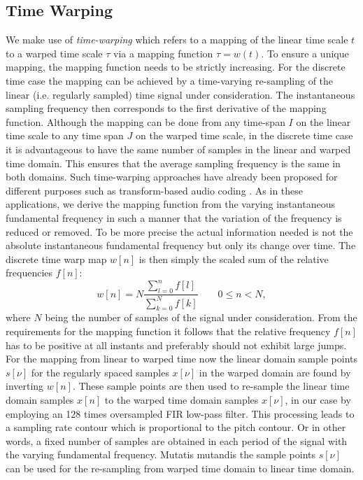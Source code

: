 \subsection{Time Warping}
We make use of \emph{time-warping} which refers to a mapping of the linear time scale $t$ to a warped time scale $\tau$ via a mapping function $\tau=w(t)$.
To ensure a unique mapping, the mapping function needs to be strictly increasing.
For the discrete time case the mapping can be achieved by a time-varying re-sampling of the linear (i.e. regularly sampled) time signal under consideration.
The instantaneous sampling frequency then corresponds to the first derivative of
the mapping function. Although the mapping can be done from any time-span
$I$ on the linear time scale to any time span $J$ on the warped time scale, in
the discrete time case it is advantageous to have the same number of samples
in the linear and warped time domain. This ensures that the average sampling
frequency is the same in both domains. Such time-warping approaches have already
been proposed for different purposes such as transform-based audio coding
\cite{edler09}. As in these applications, we derive the mapping function from
the varying instantaneous fundamental frequency in such a manner that the variation of the frequency is
reduced or removed. To be more precise the actual information needed is not
the absolute instantaneous fundamental frequency but only its change over time.
The discrete time warp map $w[n]$ is then simply the scaled sum of the relative
frequencies $f[n]$:
\begin{equation}
w[n]=N \frac{\sum^n_{l=0}{f[l]}}{\sum^N_{k=0}{f[k]}}  \qquad 0\leq n<N,
\end{equation}
where $N$ being the number of samples of the signal under consideration.
From the requirements for the mapping function it follows that the relative
frequency $f[n]$ has to be positive at all instants and preferably should not
exhibit large jumps.
For the mapping from linear to warped time now the linear domain sample points
$s[\nu]$ for the regularly spaced samples $x[\nu]$ in the warped domain are
found by inverting $w[n]$. These sample points are then used to re-sample the linear time
domain samples $x[n]$ to the warped time domain samples $x[\nu]$, in our case
by employing an 128 times oversampled FIR low-pass filter. This processing leads to a sampling rate contour which is proportional to the pitch contour. Or in other words, a fixed number of samples are obtained in each period of the signal with the varying fundamental frequency. Mutatis mutandis the sample points $s[\nu]$ can be used for the re-sampling from warped time domain to linear time
domain. \\

